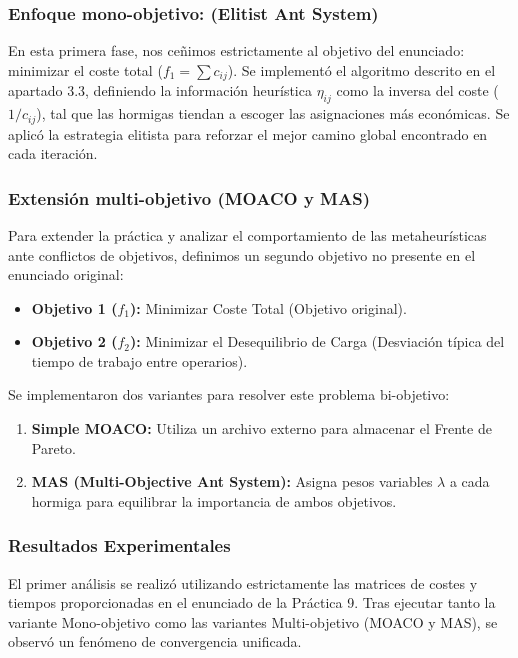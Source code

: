 \subsubsection{Enfoque mono-objetivo: (Elitist Ant System)}

En esta primera fase, nos ceñimos estrictamente al objetivo del enunciado: minimizar el coste total ($f_1 = \sum c_{ij}$). Se implementó el algoritmo descrito en el apartado 3.3, definiendo la información heurística $\eta_{ij}$ como la inversa del coste ($1/c_{ij}$), tal que las hormigas tiendan a escoger las asignaciones más económicas. Se aplicó la estrategia elitista para reforzar el mejor camino global encontrado en cada iteración.

\subsubsection{Extensión multi-objetivo (MOACO y MAS)}

Para extender la práctica y analizar el comportamiento de las metaheurísticas ante conflictos de objetivos, definimos un segundo objetivo no presente en el enunciado original:
\begin{itemize}
    \item \textbf{Objetivo 1 ($f_1$):} Minimizar Coste Total (Objetivo original).
    \item \textbf{Objetivo 2 ($f_2$):} Minimizar el Desequilibrio de Carga (Desviación típica del tiempo de trabajo entre operarios).
\end{itemize}

Se implementaron dos variantes para resolver este problema bi-objetivo:
\begin{enumerate}
    \item \textbf{Simple MOACO:} Utiliza un archivo externo para almacenar el Frente de Pareto.
    \item \textbf{MAS (Multi-Objective Ant System):} Asigna pesos variables $\lambda$ a cada hormiga para equilibrar la importancia de ambos objetivos.
\end{enumerate}
\subsubsection{Resultados Experimentales}

El primer análisis se realizó utilizando estrictamente las matrices de costes y tiempos proporcionadas en el enunciado de la Práctica 9. Tras ejecutar tanto la variante Mono-objetivo como las variantes Multi-objetivo (MOACO y MAS), se observó un fenómeno de convergencia unificada.

